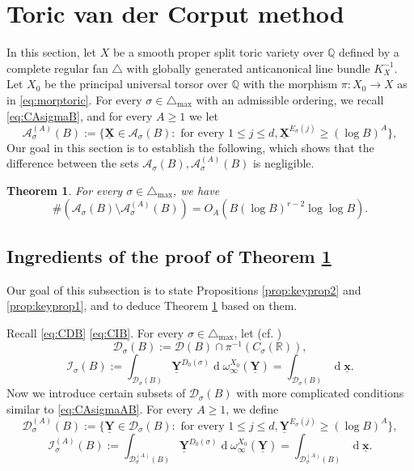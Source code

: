 \documentclass[11pt,letterpaper]{amsart}
\newcommand{\BQ}{{\mathbb {Q}}}
\newcommand{\BR}{{\mathbb {R}}}
\newcommand{\CA}{{\mathcal {A}}}
\newcommand{\CD}{{\mathcal {D}}}
\newcommand{\CI}{{\mathcal {I}}}
\newcommand{\XX}{\underline{\mathbf{X}}}
\newcommand{\xx}{\underline{\mathbf{x}}}
\newcommand{\YY}{\underline{\mathbf{Y}}}
\theoremstyle{plain}
\numberwithin{equation}{section}
\newtheorem{theorem}{Theorem}[section]
\theoremstyle{definition}
\theoremstyle{remark}
\begin{document}
\section{Toric van der Corput method}\label{se:toricvandercorput}
In this section, let $X$ be a smooth proper split toric variety over $\BQ$ defined by a complete regular fan $\triangle$ with globally generated anticanonical line bundle $K_X^{-1}$. Let $X_0$ be the principal universal torsor over $\BQ$ with the morphism $\pi:X_0\to X$ as in \eqref{eq:morptoric}.  
For every $\sigma\in\triangle_{\max}$ with an admissible ordering, we recall \eqref{eq:CAsigmaB}, and for every $A\geqslant 1$ we let 
\begin{equation}\label{eq:CAsigmaAB}
	\CA^{(A)}_\sigma(B):=\{\XX\in\CA_\sigma(B):\text{ for every }1\leqslant j\leqslant d, \XX^{E_\sigma(j)}\geqslant (\log B)^A\},
\end{equation}  
Our goal in this section is to establish the following, which shows that the difference between the sets $\CA_\sigma(B),\CA^{(A)}_\sigma(B)$ is negligible.
\begin{theorem}\label{thm:CABCAAB}
	For every $\sigma\in\triangle_{\max}$, we have $$\#\left(\CA_\sigma(B)\setminus\CA^{(A)}_\sigma(B)\right)=O_A(B(\log B)^{r-2}\log\log B).$$
\end{theorem}	

\subsection{Ingredients of the proof of Theorem \ref{thm:CABCAAB}}
Our goal of this subsection is to state Propositions \ref{prop:keyprop2} and \ref{prop:keyprop1}, and to deduce Theorem \ref{thm:CABCAAB} based on them.

Recall \eqref{eq:CDB} \eqref{eq:CIB}. For every $\sigma\in\triangle_{\max}$, let (cf. \cite[11.31]{Salberger})
\begin{equation}\label{eq:CDsigmaB}
		\CD_\sigma(B):=\CD(B)\cap \pi^{-1}(C_{\sigma}(\BR)), 
\end{equation}
\begin{equation}\label{eq:CIsigmaB}
	\CI_\sigma(B):=\int_{\CD_\sigma(B)}\YY^{D_0(\sigma)}\operatorname{d}\omega^{X_0}_{\infty}(\YY)=\int_{\CD_\sigma(B)}\operatorname{d}\xx.
\end{equation} 
Now we introduce certain subsets of $\CD_\sigma(B)$ with more complicated conditions similar to \eqref{eq:CAsigmaAB}. For every $A\geqslant 1$, we define 
\begin{equation}\label{eq:CDsigmaAB}
	\CD_\sigma^{(A)}(B):=\{\YY\in\CD_\sigma(B):\text{ for every } 1\leqslant j\leqslant d,\YY^{E_\sigma(j)}\geqslant (\log B)^A\},
\end{equation} \begin{equation}\label{eq:CIsigmaAB}
	\CI_\sigma^{(A)}(B):=\int_{\CD_\sigma^{(A)}(B)}\YY^{D_0(\sigma)}\operatorname{d}\omega^{X_0}_{\infty}(\YY)=\int_{\CD_\sigma^{(A)}(B)}\operatorname{d}\xx.
\end{equation}
\end{document}
